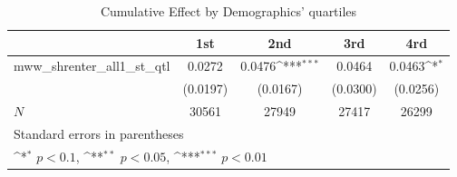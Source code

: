\begin{table}[htbp]\centering
\def\sym#1{\ifmmode^{#1}\else\(^{#1}\)\fi}
\caption{Cumulative Effect by Demographics' quartiles}
\begin{tabular}{l*{4}{c}}
\hline\hline
            &\multicolumn{1}{c}{1st}&\multicolumn{1}{c}{2nd}&\multicolumn{1}{c}{3rd}&\multicolumn{1}{c}{4rd}\\
\hline
mww\_shrenter\_all1\_st\_qtl&      0.0272         &      0.0476\sym{***}&      0.0464         &      0.0463\sym{*}  \\
            &    (0.0197)         &    (0.0167)         &    (0.0300)         &    (0.0256)         \\
\hline
\(N\)       &       30561         &       27949         &       27417         &       26299         \\
\hline\hline
\multicolumn{5}{l}{\footnotesize Standard errors in parentheses}\\
\multicolumn{5}{l}{\footnotesize \sym{*} \(p<0.1\), \sym{**} \(p<0.05\), \sym{***} \(p<0.01\)}\\
\end{tabular}
\end{table}
